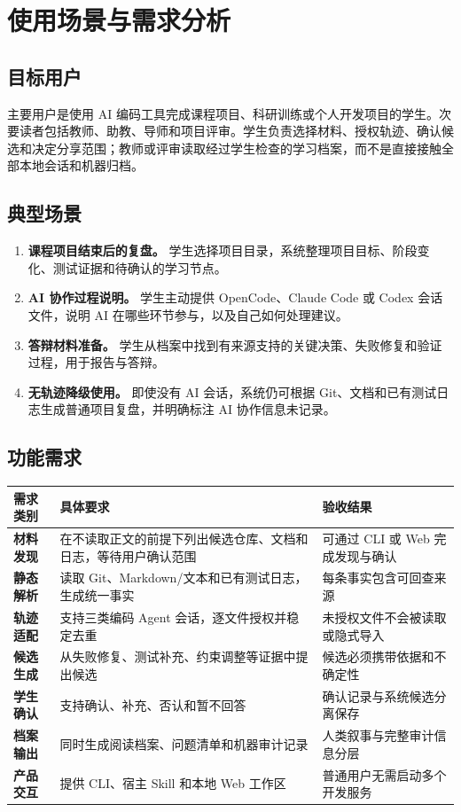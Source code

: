 \documentclass[UTF8,a4paper,12pt]{ctexart}
\begin{document}
\section{使用场景与需求分析}

\subsection{目标用户}

主要用户是使用 AI 编码工具完成课程项目、科研训练或个人开发项目的学生。次要读者包括教师、助教、导师和项目评审。学生负责选择材料、授权轨迹、确认候选和决定分享范围；教师或评审读取经过学生检查的学习档案，而不是直接接触全部本地会话和机器归档。

\subsection{典型场景}

\begin{enumerate}
  \item \textbf{课程项目结束后的复盘。} 学生选择项目目录，系统整理项目目标、阶段变化、测试证据和待确认的学习节点。
  \item \textbf{AI 协作过程说明。} 学生主动提供 OpenCode、Claude Code 或 Codex 会话文件，说明 AI 在哪些环节参与，以及自己如何处理建议。
  \item \textbf{答辩材料准备。} 学生从档案中找到有来源支持的关键决策、失败修复和验证过程，用于报告与答辩。
  \item \textbf{无轨迹降级使用。} 即使没有 AI 会话，系统仍可根据 Git、文档和已有测试日志生成普通项目复盘，并明确标注 AI 协作信息未记录。
\end{enumerate}

\subsection{功能需求}

\begin{center}
\small
\begin{tabularx}{\textwidth}{>{\bfseries}p{}X p{}}
\toprule
需求类别 & 具体要求 & 验收结果 \\
\midrule
材料发现 & 在不读取正文的前提下列出候选仓库、文档和日志，等待用户确认范围 & 可通过 CLI 或 Web 完成发现与确认 \\
静态解析 & 读取 Git、Markdown/文本和已有测试日志，生成统一事实 & 每条事实包含可回查来源 \\
轨迹适配 & 支持三类编码 Agent 会话，逐文件授权并稳定去重 & 未授权文件不会被读取或隐式导入 \\
候选生成 & 从失败修复、测试补充、约束调整等证据中提出候选 & 候选必须携带依据和不确定性 \\
学生确认 & 支持确认、补充、否认和暂不回答 & 确认记录与系统候选分离保存 \\
档案输出 & 同时生成阅读档案、问题清单和机器审计记录 & 人类叙事与完整审计信息分层 \\
产品交互 & 提供 CLI、宿主 Skill 和本地 Web 工作区 & 普通用户无需启动多个开发服务 \\
\bottomrule
\end{tabularx}
\end{center}
\end{document}
